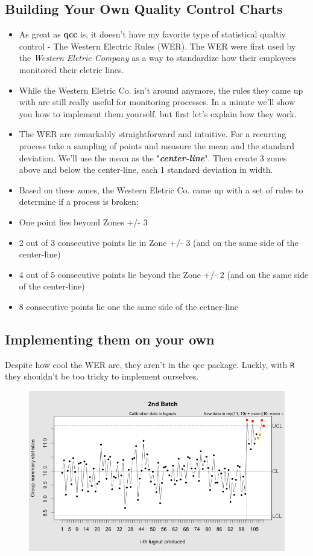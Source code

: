 \documentclass[a4paper,12pt]{article}
\begin{document}
\subsection{Building Your Own Quality Control Charts}
\begin{itemize}
\item As great as \textbf{qcc} is, it doesn't have my favorite type of statistical qualtiy control - The Western Electric Rules (WER). The WER were first used by the \textit{Western Eletric Company} as a way to standardize how their employees monitored their eletric lines. 

\item While the Western Eletric Co. isn't around anymore, the rules they came up with are still really useful for monitoring processes. In a minute we'll show you how to implement them yourself, but first let's explain how they work.

\item The WER are remarkably straightforward and intuitive. For a recurring process take a sampling of points and measure the mean and the standard deviation. We'll use the mean as the "\textit{\textbf{center-line}}". Then create 3 zones above and below the center-line, each 1 standard deviation in width.


\item Based on these zones, the Western Eletric Co. came up with a set of rules to determine if a process is broken:
\end{itemize}
\begin{itemize}
\item One point lies beyond Zones +/- 3
\item 2 out of 3 consecutive points lie in Zone +/- 3 (and on the same side of the center-line)
\item 4 out of 5 consecutive points lie beyond the Zone +/- 2 (and on the same side of the center-line)
\item 8 consecutive points lie one the same side of the cetner-line
\end{itemize}

\newpage
\subsection{Implementing them on your own}
Despite how cool the WER are, they aren't in the qcc package. Luckly, with \texttt{R} they shouldn't be too tricky to implement ourselves.

\begin{figure}[h!]
\centering
\includegraphics[width=0.7\linewidth]{./sqcr3}
\caption{}
\label{fig:sqcr3}
\end{figure}
\end{document}

